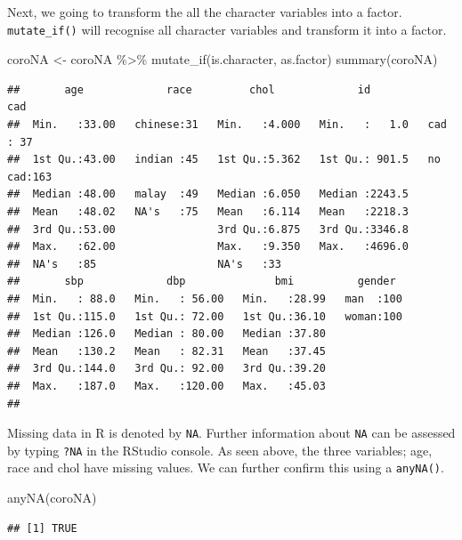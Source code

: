\documentclass[
  10pt,
]{krantz}
\newenvironment{Shaded}{\begin{snugshade}}{\end{snugshade}}
\newcommand{\FunctionTok}[1]{\textcolor[rgb]{0.00,0.00,0.00}{#1}}
\newcommand{\NormalTok}[1]{#1}
\newcommand{\OtherTok}[1]{\textcolor[rgb]{0.56,0.35,0.01}{#1}}
\newcommand{\SpecialCharTok}[1]{\textcolor[rgb]{0.00,0.00,0.00}{#1}}
\begin{document}
Next, we going to transform the all the character variables into a factor. \texttt{mutate\_if()} will recognise all character variables and transform it into a factor.

\begin{Shaded}
\begin{Highlighting}[]
\NormalTok{coroNA }\OtherTok{\textless{}{-}} 
\NormalTok{  coroNA }\SpecialCharTok{\%\textgreater{}\%} 
  \FunctionTok{mutate\_if}\NormalTok{(is.character, as.factor)}
\FunctionTok{summary}\NormalTok{(coroNA)}
\end{Highlighting}
\end{Shaded}

\begin{verbatim}
##       age             race         chol             id             cad     
##  Min.   :33.00   chinese:31   Min.   :4.000   Min.   :   1.0   cad   : 37  
##  1st Qu.:43.00   indian :45   1st Qu.:5.362   1st Qu.: 901.5   no cad:163  
##  Median :48.00   malay  :49   Median :6.050   Median :2243.5               
##  Mean   :48.02   NA's   :75   Mean   :6.114   Mean   :2218.3               
##  3rd Qu.:53.00                3rd Qu.:6.875   3rd Qu.:3346.8               
##  Max.   :62.00                Max.   :9.350   Max.   :4696.0               
##  NA's   :85                   NA's   :33                                   
##       sbp             dbp              bmi          gender   
##  Min.   : 88.0   Min.   : 56.00   Min.   :28.99   man  :100  
##  1st Qu.:115.0   1st Qu.: 72.00   1st Qu.:36.10   woman:100  
##  Median :126.0   Median : 80.00   Median :37.80              
##  Mean   :130.2   Mean   : 82.31   Mean   :37.45              
##  3rd Qu.:144.0   3rd Qu.: 92.00   3rd Qu.:39.20              
##  Max.   :187.0   Max.   :120.00   Max.   :45.03              
## 
\end{verbatim}

Missing data in R is denoted by \texttt{NA}. Further information about \texttt{NA} can be assessed by typing \texttt{?NA} in the RStudio console. As seen above, the three variables; age, race and chol have missing values. We can further confirm this using a \texttt{anyNA()}.

\begin{Shaded}
\begin{Highlighting}[]
\FunctionTok{anyNA}\NormalTok{(coroNA)}
\end{Highlighting}
\end{Shaded}

\begin{verbatim}
## [1] TRUE
\end{verbatim}
\end{document}

